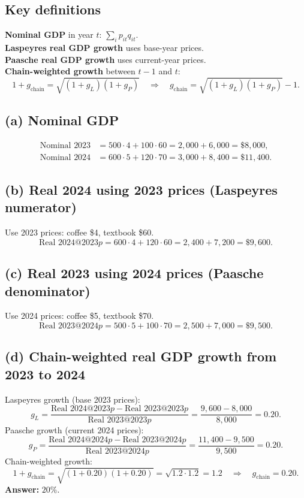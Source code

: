 \documentclass[11pt]{article}
\newcommand{\defn}[1]{\textbf{#1}}
\newcommand{\bn}{\vspace{0.25em}\noindent}
\begin{document}
\subsection*{Key definitions}
\bn \defn{Nominal GDP} in year \(t\): \( \sum_i p_{it}q_{it}\).\\
\defn{Laspeyres real GDP growth} uses base-year prices.\\
\defn{Paasche real GDP growth} uses current-year prices.\\
\defn{Chain-weighted growth} between \(t-1\) and \(t\):
\[
1+g_{\text{chain}}=\sqrt{(1+g_L)(1+g_P)}\quad\Longrightarrow\quad g_{\text{chain}}=\sqrt{(1+g_L)(1+g_P)}-1.
\]

\subsection*{(a) Nominal GDP}
\[
\begin{aligned}
\text{Nominal }2023 &= 500\cdot 4 + 100\cdot 60 = 2{,}000 + 6{,}000 = \$8{,}000,\\
\text{Nominal }2024 &= 600\cdot 5 + 120\cdot 70 = 3{,}000 + 8{,}400 = \$11{,}400.
\end{aligned}
\]

\subsection*{(b) Real 2024 using 2023 prices (Laspeyres numerator)}
Use 2023 prices: coffee \$4, textbook \$60.
\[
\text{Real }2024@2023p = 600\cdot 4 + 120\cdot 60 = 2{,}400 + 7{,}200 = \boxed{\$9{,}600}.
\]

\subsection*{(c) Real 2023 using 2024 prices (Paasche denominator)}
Use 2024 prices: coffee \$5, textbook \$70.
\[
\text{Real }2023@2024p = 500\cdot 5 + 100\cdot 70 = 2{,}500 + 7{,}000 = \boxed{\$9{,}500}.
\]

\subsection*{(d) Chain-weighted real GDP growth from 2023 to 2024}
Laspeyres growth (base 2023 prices):
\[
g_L=\frac{\text{Real }2024@2023p - \text{Real }2023@2023p}{\text{Real }2023@2023p}
=\frac{9{,}600 - 8{,}000}{8{,}000}=0.20.
\]
Paasche growth (current 2024 prices):
\[
g_P=\frac{\text{Real }2024@2024p - \text{Real }2023@2024p}{\text{Real }2023@2024p}
=\frac{11{,}400 - 9{,}500}{9{,}500}=0.20.
\]
Chain-weighted growth:
\[
1+g_{\text{chain}}=\sqrt{(1+0.20)(1+0.20)}=\sqrt{1.2\cdot 1.2}=1.2\quad\Rightarrow\quad g_{\text{chain}}=0.20.
\]
\textbf{Answer:} \(\boxed{20\%}\).
\end{document}
